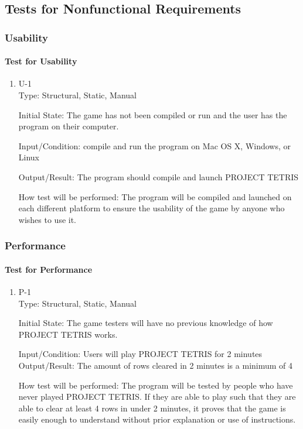 \documentclass[12pt, titlepage]{article}
\begin{document}
\subsection{Tests for Nonfunctional Requirements}
\subsubsection{Usability}
\paragraph{Test for Usability}
\begin{enumerate}
\item{U-1\\}
Type: Structural, Static, Manual
					
Initial State: The game has not been compiled or run and the user has the program on their computer.
					
Input/Condition: compile and run the program on Mac OS X, Windows, or Linux
					
Output/Result: The program should compile and launch PROJECT TETRIS
					
How test will be performed: The program will be compiled and launched on each different platform to ensure the usability of the game by anyone who wishes to use it.
					
\end{enumerate}

\subsubsection{Performance}
		
\paragraph{Test for Performance}
\begin{enumerate}
\item{P-1\\}
Type: Structural, Static, Manual
					
Initial State: The game testers will have no previous knowledge of how PROJECT TETRIS works.
					
Input/Condition: Users will play PROJECT TETRIS for 2 minutes					
Output/Result: The amount of rows cleared in 2 minutes is a minimum of 4
					
How test will be performed: The program will be tested by people who have never played PROJECT TETRIS. If they are able to play such that they are able to clear at least 4 rows in under 2 minutes, it proves that the game is easily enough to understand without prior explanation or use of instructions.
					
\end{enumerate}
\end{document}
